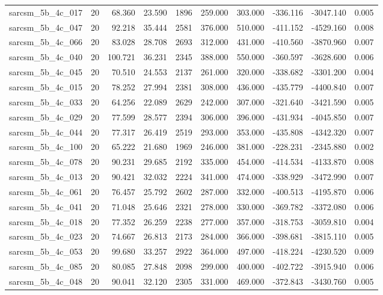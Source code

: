 \begin{tabular}{lrrrrrrrrr}
sarcsm\_5b\_4c\_017 & 20 & 68.360 & 23.590 & 1896 & 259.000 & 303.000 & -336.116 & -3047.140 & 0.005 \\
sarcsm\_5b\_4c\_047 & 20 & 92.218 & 35.444 & 2581 & 376.000 & 510.000 & -411.152 & -4529.160 & 0.008 \\
sarcsm\_5b\_4c\_066 & 20 & 83.028 & 28.708 & 2693 & 312.000 & 431.000 & -410.560 & -3870.960 & 0.007 \\
sarcsm\_5b\_4c\_040 & 20 & 100.721 & 36.231 & 2345 & 388.000 & 550.000 & -360.597 & -3628.600 & 0.006 \\
sarcsm\_5b\_4c\_045 & 20 & 70.510 & 24.553 & 2137 & 261.000 & 320.000 & -338.682 & -3301.200 & 0.004 \\
sarcsm\_5b\_4c\_015 & 20 & 78.252 & 27.994 & 2381 & 308.000 & 436.000 & -435.779 & -4400.840 & 0.007 \\
sarcsm\_5b\_4c\_033 & 20 & 64.256 & 22.089 & 2629 & 242.000 & 307.000 & -321.640 & -3421.590 & 0.005 \\
sarcsm\_5b\_4c\_029 & 20 & 77.599 & 28.577 & 2394 & 306.000 & 396.000 & -431.934 & -4045.850 & 0.007 \\
sarcsm\_5b\_4c\_044 & 20 & 77.317 & 26.419 & 2519 & 293.000 & 353.000 & -435.808 & -4342.320 & 0.007 \\
sarcsm\_5b\_4c\_100 & 20 & 65.222 & 21.680 & 1969 & 246.000 & 381.000 & -228.231 & -2345.880 & 0.002 \\
sarcsm\_5b\_4c\_078 & 20 & 90.231 & 29.685 & 2192 & 335.000 & 454.000 & -414.534 & -4133.870 & 0.008 \\
sarcsm\_5b\_4c\_013 & 20 & 90.421 & 32.032 & 2224 & 341.000 & 474.000 & -338.929 & -3472.990 & 0.007 \\
sarcsm\_5b\_4c\_061 & 20 & 76.457 & 25.792 & 2602 & 287.000 & 332.000 & -400.513 & -4195.870 & 0.006 \\
sarcsm\_5b\_4c\_041 & 20 & 71.048 & 25.646 & 2321 & 278.000 & 330.000 & -369.782 & -3372.080 & 0.006 \\
sarcsm\_5b\_4c\_018 & 20 & 77.352 & 26.259 & 2238 & 277.000 & 357.000 & -318.753 & -3059.810 & 0.004 \\
sarcsm\_5b\_4c\_023 & 20 & 74.667 & 26.813 & 2173 & 284.000 & 366.000 & -398.681 & -3815.110 & 0.005 \\
sarcsm\_5b\_4c\_053 & 20 & 99.680 & 33.257 & 2922 & 364.000 & 497.000 & -418.224 & -4230.520 & 0.009 \\
sarcsm\_5b\_4c\_085 & 20 & 80.085 & 27.848 & 2098 & 299.000 & 400.000 & -402.722 & -3915.940 & 0.006 \\
sarcsm\_5b\_4c\_048 & 20 & 90.041 & 32.120 & 2305 & 331.000 & 469.000 & -372.843 & -3430.760 & 0.005 \\

\end{tabular}
